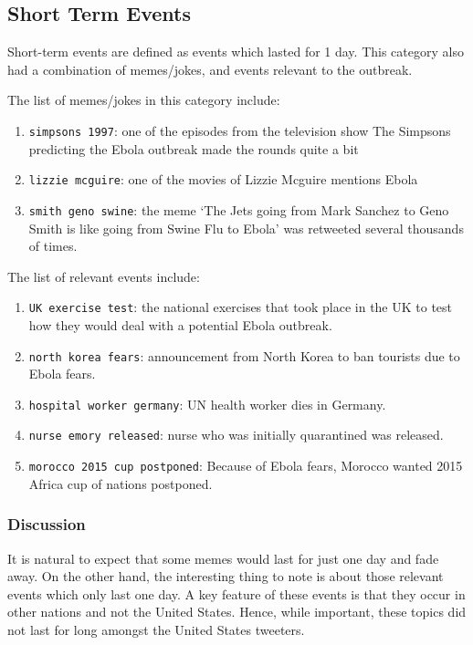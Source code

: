 \subsection{Short Term Events}
Short-term events are defined as events which lasted for 1  day. This category also
had a combination of memes/jokes, and events relevant to the outbreak.

The list of memes/jokes in this category include:
\begin{enumerate}
\item \texttt{simpsons 1997}:  one of the episodes from the television show The Simpsons predicting the Ebola
outbreak made the rounds quite a bit
\item \texttt{lizzie mcguire}:  one of the movies of Lizzie Mcguire mentions Ebola
\item \texttt{smith geno swine}:  the meme `The Jets going from Mark Sanchez to Geno Smith is like going from Swine Flu
to Ebola' was retweeted several thousands of times.
\end{enumerate}

The list of relevant events include:
\begin{enumerate}
\item \texttt{UK exercise test}:  the national exercises
that took place in the UK to test how they would deal with a
potential Ebola outbreak.
\item \texttt{north korea fears}: announcement from North Korea to ban tourists due to Ebola fears.
\item \texttt{hospital worker germany}:  UN health worker dies in Germany.
\item \texttt{nurse emory released}:  nurse who was initially quarantined was released.
\item \texttt{morocco 2015 cup postponed}:  Because of Ebola fears, Morocco wanted 2015 Africa cup of nations postponed.
\end{enumerate}

\subsubsection{Discussion} 
It is natural to expect that some memes would last for just one day and fade away.
On the other hand, the interesting thing to note is about those relevant events
which only last one day.  
A key feature of these events is that they occur in other nations
and not the United States.  Hence, while important, these topics did not last for
long amongst the United States tweeters.
